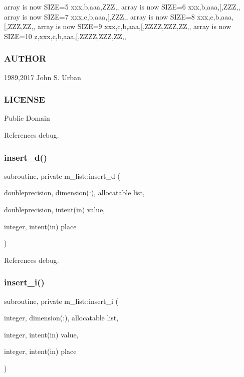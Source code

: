array is now S\+I\+ZE=5 xxx,b,aaa,Z\+ZZ,, array is now S\+I\+ZE=6 xxx,b,aaa,\mbox{[},Z\+ZZ,, array is now S\+I\+ZE=7 xxx,c,b,aaa,\mbox{[},Z\+ZZ,, array is now S\+I\+ZE=8 xxx,c,b,aaa,\mbox{[},Z\+ZZ,ZZ,, array is now S\+I\+ZE=9 xxx,c,b,aaa,\mbox{[},Z\+Z\+ZZ,Z\+ZZ,ZZ,, array is now S\+I\+ZE=10 z,xxx,c,b,aaa,\mbox{[},Z\+Z\+ZZ,Z\+ZZ,ZZ,,

\subsubsection*{A\+U\+T\+H\+OR}

1989,2017 John S. Urban \subsubsection*{L\+I\+C\+E\+N\+SE}

Public Domain 

References debug.

\mbox{\label{namespacem__list_ae2356cb1ec5b313c3fcbad090d6eb440}} 
\subsubsection{\texorpdfstring{insert\+\_\+d()}{insert\_d()}}
{\footnotesize\ttfamily subroutine, private m\+\_\+list\+::insert\+\_\+d (\begin{DoxyParamCaption}\item[{doubleprecision, dimension(\+:), allocatable}]{list,  }\item[{doubleprecision, intent(in)}]{value,  }\item[{integer, intent(in)}]{place }\end{DoxyParamCaption})\hspace{0.3cm}{\ttfamily [private]}}



References debug.

\mbox{\label{namespacem__list_a7d50f88bd8d25138af4e6d484aca2cbc}} 
\subsubsection{\texorpdfstring{insert\+\_\+i()}{insert\_i()}}
{\footnotesize\ttfamily subroutine, private m\+\_\+list\+::insert\+\_\+i (\begin{DoxyParamCaption}\item[{integer, dimension(\+:), allocatable}]{list,  }\item[{integer, intent(in)}]{value,  }\item[{integer, intent(in)}]{place }\end{DoxyParamCaption})\hspace{0.3cm}{\ttfamily [private]}}



